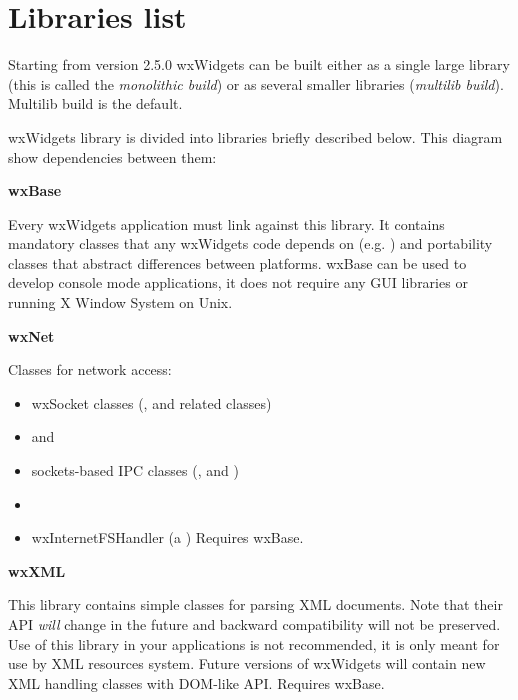 \chapter{Libraries list}\label{librarieslist}
%
\setfooter{\thepage}{}{}{}{}{\thepage}%

Starting from version 2.5.0 wxWidgets can be built either as a single large
library (this is called the {\it monolithic build}) or as several smaller
libraries ({\it multilib build}). Multilib build is the default.

wxWidgets library is divided into libraries briefly described below. This
diagram show dependencies between them:

\begin{center}
\end{center}

{\large {\bf wxBase}}

Every wxWidgets application must link against this library. It contains
mandatory classes that any wxWidgets code depends on (e.g.
 ) and portability classes that abstract
differences between platforms. wxBase can be used to develop console mode
applications, it does not require any GUI libraries or running X Window System
on Unix.

{\large {\bf wxNet}}

Classes for network access:

\begin{itemize}
\item{ wxSocket classes (,
  and related classes) }
\item{  and
  }
\item{ sockets-based IPC classes (,
  and
 ) }
\item{  }
\item{ wxInternetFSHandler (a ) }
Requires wxBase.
\end{itemize}

{\large {\bf wxXML}}

This library contains simple classes for parsing XML documents. Note that
their API {\em will} change in the future and backward
compatibility will not be preserved. Use of this library in your applications
is not recommended, it is only meant for use by XML resources system. Future
versions of wxWidgets will contain new XML handling classes with DOM-like API.
Requires wxBase.

